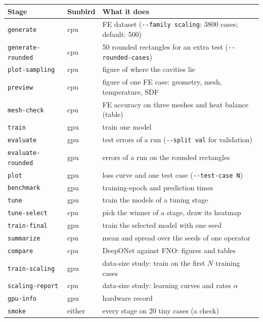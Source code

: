 \documentclass[11pt,a4paper]{article}
\newcommand{\code}[1]{\lstinline{#1}}
\begin{document}
\begin{center}
\begin{tabularx}{\textwidth}{@{}llY@{}}
\toprule
Stage & Sunbird & What it does \\
\midrule
\code{generate}         & cpu & FE dataset (\code{--family scaling}: 3800 cases; default: 500) \\
\code{generate-rounded} & cpu & 50 rounded rectangles for an extra test (\code{--rounded-cases}) \\
\code{plot-sampling}    & cpu & figure of where the cavities lie \\
\code{preview}          & cpu & figure of one FE case: geometry, mesh, temperature, SDF \\
\code{mesh-check}       & cpu & FE accuracy on three meshes and heat balance (table) \\
\code{train}            & gpu & train one model \\
\code{evaluate}         & gpu & test errors of a run (\code{--split val} for validation) \\
\code{evaluate-rounded} & gpu & errors of a run on the rounded rectangles \\
\code{plot}             & gpu & loss curve and one test case (\code{--test-case N}) \\
\code{benchmark}        & gpu & training-epoch and prediction times \\
\code{tune}             & gpu & train the models of a tuning stage \\
\code{tune-select}      & cpu & pick the winner of a stage, draw its heatmap \\
\code{train-final}      & gpu & train the selected model with one seed \\
\code{summarize}        & cpu & mean and spread over the seeds of one operator \\
\code{compare}          & cpu & DeepONet against FNO: figures and tables \\
\code{train-scaling}    & gpu & data-size study: train on the first $N$ training cases \\
\code{scaling-report}   & cpu & data-size study: learning curves and rates $\alpha$ \\
\code{gpu-info}         & gpu & hardware record \\
\code{smoke}            & either & every stage on 20 tiny cases (a check) \\
\bottomrule
\end{tabularx}
\end{center}
\end{document}
